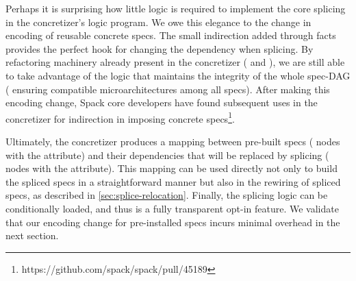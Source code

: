 Perhaps it is surprising how little logic is required to implement the core
splicing in the concretizer's logic program. We owe this elegance to the change
in encoding of reusable concrete specs. The small indirection added through
 facts provides the perfect hook for changing the dependency
when splicing. By refactoring machinery already present in the concretizer (\ie{}
 and ), we are still able to take advantage
of the logic that maintains the integrity of the whole spec-DAG (\eg{} ensuring
compatible microarchitectures among all specs). After making this encoding
change, Spack core developers have found subsequent uses in the concretizer for
indirection in imposing concrete specs\footnote{https://github.com/spack/spack/pull/45189}.

Ultimately, the concretizer produces a mapping between pre-built specs (\ie{}
nodes with the  attribute) and their dependencies that will be
replaced by splicing (\ie{} nodes with the  attribute). This
mapping can be used directly not only to build the spliced specs in a
straightforward manner but also in the rewiring of spliced specs, as
described in \cref{sec:splice-relocation}. Finally, the splicing logic can be
conditionally loaded, and thus is a fully transparent opt-in feature. We
validate that our encoding change for pre-installed specs incurs minimal
overhead in the next section.

